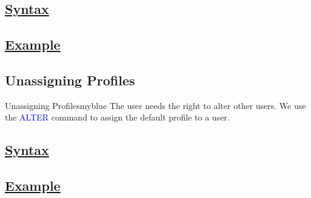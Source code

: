 \vspace{0.15cm}
\subsection*{\underline{Syntax}} 


\vspace{0.15cm}
\subsection*{\underline{Example}} 




\vspace{0.25cm}
\subsection{Unassigning Profiles} 
\begin{prettyBox}{Unassigning Profiles}{myblue}
The user needs the right to alter other users. We use the
\textcolor{blue}{ALTER} command to assign the default profile to a user. 
\end{prettyBox}

\vspace{0.15cm}
\subsection*{\underline{Syntax}} 


\vspace{0.15cm}
\subsection*{\underline{Example}} 

